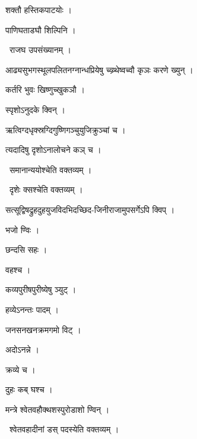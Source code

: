 \documentclass[10pt, openany, oneside]{book}
\begin{document}
\noindent शक्तौ हस्तिकपाटयोः ।

\noindent पाणिघताडघौ शिल्पिनि ।

\par\noindent\hspace{1.5em}{\vps वा॰}~{\qt राजघ उपसंख्यानम् ।}

\noindent आढ्यसुभगस्थूलपलितनग्नान्धप्रियेषु च्व्य्र्थेष्वच्वौ कृञः करणे ख्युन् ।

\noindent कर्तरि भुवः खिष्णुच्खुकञौ ।

\noindent स्पृशोऽनुदके क्विन् ।

\noindent ऋत्विग्दधृक्स्रग्दिगुष्णिगञ्चुयुजिक्रुञ्चां च ।

\noindent त्यदादिषु दृशोऽनालोचने कञ् च ।

\par\noindent\hspace{1.5em}{\vps वा॰}~{\qt समानान्ययोश्चेति वक्तव्यम् ।}

\par\noindent\hspace{1.5em}{\vps वा॰}~{\qt दृशेः क्सश्चेति वक्तव्यम् ।}

\noindent सत्सूद्विषद्रुहदुहयुजविदभिदच्छिद-जिनीराजामुपसर्गेऽपि क्विप् ।

\noindent भजो ण्विः ।

\noindent छन्दसि सहः ।

\noindent वहश्च ।

\noindent कव्यपुरीषपुरीष्येषु ञ्युट् ।

\noindent हव्येऽनन्तः पादम् ।

\noindent जनसनखनक्रमगमो विट् ।

\noindent अदोऽनन्ने ।

\noindent क्रव्ये च ।

\noindent दुहः कब् घश्च ।

\noindent मन्त्रे श्वेतवहौक्थशस्पुरोडाशो ण्विन् ।

\par\noindent\hspace{1.5em}{\vps वा॰}~{\qt श्वेतवहादीनां डस् पदस्येति वक्तव्यम् ।}
\end{document}

